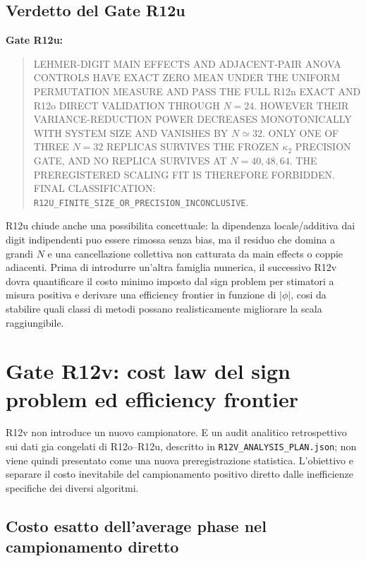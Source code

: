 \documentclass[11pt,a4paper]{article}
\newcommand{\status}[1]{\textsf{#1}}
\begin{document}
\subsection{Verdetto del Gate R12u}

\textbf{Gate R12u:}
\begin{quote}
\status{LEHMER-DIGIT MAIN EFFECTS AND ADJACENT-PAIR ANOVA CONTROLS HAVE EXACT ZERO MEAN UNDER THE UNIFORM PERMUTATION MEASURE AND PASS THE FULL R12n EXACT AND R12o DIRECT VALIDATION THROUGH $N=24$. HOWEVER THEIR VARIANCE-REDUCTION POWER DECREASES MONOTONICALLY WITH SYSTEM SIZE AND VANISHES BY $N\simeq32$. ONLY ONE OF THREE $N=32$ REPLICAS SURVIVES THE FROZEN $\kappa_2$ PRECISION GATE, AND NO REPLICA SURVIVES AT $N=40,48,64$. THE PREREGISTERED SCALING FIT IS THEREFORE FORBIDDEN. FINAL CLASSIFICATION:} \texttt{R12U\_FINITE\_SIZE\_OR\_PRECISION\_INCONCLUSIVE}.
\end{quote}

R12u chiude anche una possibilita concettuale: la dipendenza locale/additiva dai digit indipendenti puo essere rimossa senza bias, ma il residuo che domina a grandi $N$ e una cancellazione collettiva non catturata da main effects o coppie adiacenti. Prima di introdurre un'altra famiglia numerica, il successivo R12v dovra quantificare il costo minimo imposto dal sign problem per stimatori a misura positiva e derivare una efficiency frontier in funzione di $|\phi|$, cosi da stabilire quali classi di metodi possano realisticamente migliorare la scala raggiungibile.


\section{Gate R12v: cost law del sign problem ed efficiency frontier}

R12v non introduce un nuovo campionatore. E un audit analitico retrospettivo sui dati gia congelati di R12o--R12u, descritto in \texttt{R12V\_ANALYSIS\_PLAN.json}; non viene quindi presentato come una nuova preregistrazione statistica. L'obiettivo e separare il costo inevitabile del campionamento positivo diretto dalle inefficienze specifiche dei diversi algoritmi.

\subsection{Costo esatto dell'average phase nel campionamento diretto}
\end{document}
